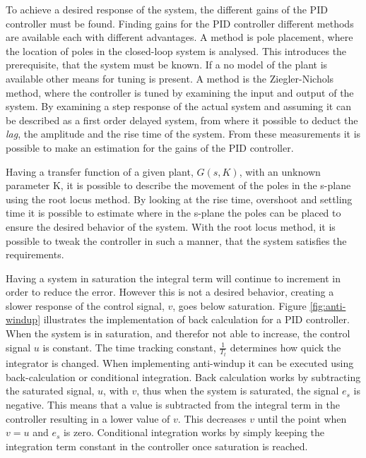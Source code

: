 \documentclass[../../main.tex]{subfiles}
\begin{document}
To achieve a desired response of the system, the different gains of the PID controller must be found. Finding gains for the PID controller different methods are available each with different advantages. A method is pole placement, where the location of poles in the closed-loop system is analysed. This introduces the prerequisite, that the system must be known. If a no model of the plant is available other means for tuning is present. A method is the Ziegler-Nichols method, where the controller is tuned by examining the input and output of the system. By examining a step response of the actual system and assuming it can be described as a first order delayed system, from where it possible to deduct the \textit{lag}, the amplitude and the rise time of the system. From these measurements it is possible to make an estimation for the gains of the PID controller.

Having a transfer function of a given plant, $G(s,K)$, with an unknown parameter K, it is possible to describe the movement of the poles in the s-plane using the root locus method. By looking at the rise time, overshoot and settling time it is possible to estimate where in the s-plane the poles can be placed to ensure the desired behavior of the system. %
With the root locus method, it is possible to tweak the controller in such a manner, that the system satisfies the requirements.

Having a system in saturation the integral term will continue to increment in order to reduce the error. However this is not a desired behavior, creating a slower response of the control signal, $v$, goes below saturation. Figure \ref{fig:anti-windup} illustrates the implementation of back calculation for a PID controller. When the system is in saturation, and therefor not able to increase, the control signal $u$ is constant. The time tracking constant, $\frac{1}{T_t}$ determines how quick the integrator is changed. When implementing anti-windup it can be executed using back-calculation or conditional integration. Back calculation works by subtracting the saturated signal, $u$, with $v$, thus when the system is saturated, the signal $e_s$ is negative. This means that a value is subtracted from the integral term in the controller resulting in a lower value of $v$. This decreases $v$ until the point when $v=u$ and $e_s$ is zero. Conditional integration works by simply keeping the integration term constant in the controller once saturation is reached. 
\end{document}
